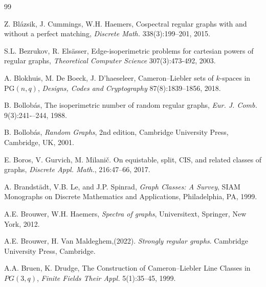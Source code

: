 \documentclass[a4paper,11pt]{article}
\theoremstyle{definition}
\newcommand{\marrow}{\marginpar[\hfill$\longrightarrow$]{$\longleftarrow$}}
\newcommand{\niceremarkcolor}[4]{\textcolor{#4}{\textsc{#1 #2:} \marrow\textsf{#3}}}
\newcommand{\jim}[2][says]{\niceremarkcolor{Jim}{#1}{#2}{Green}}
\begin{document}
\begin{thebibliography}{99}
 
 Z. Bl\'azsik, J. Cummings, W.H. Haemers, Cospectral regular graphs with and without a perfect matching, \emph{Discrete Math.} 338(3):199--201, 2015.





 S.L. Bezrukov, R. Elsässer,
Edge-isoperimetric problems for cartesian powers of regular graphs, \emph{Theoretical Computer Science} 307(3):473-492, 2003.


 A. Blokhuis, M. De Boeck, J. D’haeseleer, Cameron–Liebler sets of $k$-spaces in ${{\mathrm{PG}}}(n,q)$, \emph{Designs, Codes and Cryptography} 87(8):1839--1856, 2018.

 B. Bollobás,
The isoperimetric number of random regular graphs, \emph{Eur. J. Comb.} 9(3):241-–244, 1988.

 B. Bollobás, \emph{Random Graphs}, 
2nd edition, Cambridge University Press, Cambridge, UK, 2001.

 E. Boros, V. Gurvich, M. Milanič.
On equistable, split, CIS, and related classes of graphs, \emph{Discrete Appl. Math.}, 216:47--66, 2017.

 A. Brandstädt, V.B. Le, and J.P. Spinrad,
\emph{Graph Classes: A Survey}, SIAM Monographs on Discrete Mathematics and Applications, Philadelphia, PA, 1999.


 A.E. Brouwer, W.H. Haemers, \emph{Spectra of graphs}, Universitext, Springer, New York, 2012.

 A.E. Brouwer, H. Van Maldeghem,(2022). \textit{Strongly regular graphs}. Cambridge University Press, Cambridge. 

A.A. Bruen, K. Drudge, The Construction of Cameron–Liebler Line Classes in $PG(3,q)$, \emph{Finite Fields Their Appl.} 5(1):35--45, 1999.


\end{thebibliography}
\end{document}
